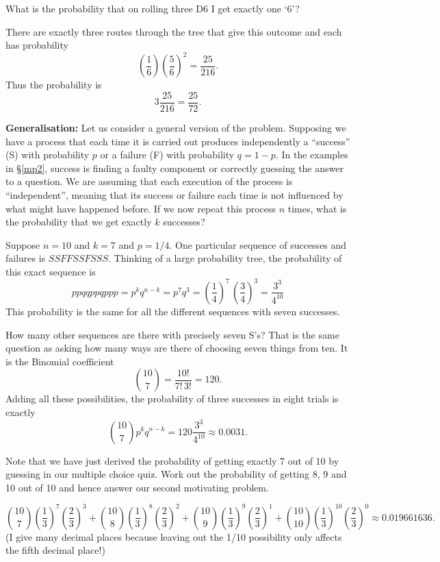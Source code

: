 \begin{example}
What is the probability that on rolling three D6 I get exactly one `6'? 

\noindent There are exactly three routes through the tree that give this outcome and each has probability 
 \[
      \left( \frac16 \right) \left( \frac56 \right)^2 = \frac{25}{216}.
 \]
Thus the probability is 
 \[
     3 \frac{25}{216} = \frac{25}{72}. 
 \] 
\end{example}
\noindent \textbf{Generalisation:} Let us consider a general version of the problem.  Supposing we have a process that each time it is carried out produces independently a ``success'' (S) with probability $p$ or a failure (F) with probability $q=1-p$. In the examples in \S\ref{mp2}, success is finding a faulty component or correctly guessing the answer to a question.  We are assuming that each execution of the process is ``independent'', meaning that its success or failure  each time is not influenced by what might have happened before.  If we now repeat this process $n$ times, what is the probability that we get exactly $k$ successes? 
\begin{example}
Suppose $n=10$ and $k=7$ and $p=1/4$. One particular sequence of successes and failures is $SSFFSSFSSS$. Thinking of a large probability tree, the probability of this exact sequence is 
 \[
    ppqqppqppp = p^k q^{n-k} = p^7 q^3 = \left( \frac14 \right)^7 \, \left( \frac34 \right)^3   = \frac{3^3}{4^{10}}
\]
This probability is the same for all the different sequences with seven successes. 

How many other sequences  are there with precisely seven S's?  That is the same question as asking how many ways are there of choosing seven things from ten.  It is the Binomial coefficient
 \[
       \binom{10}7 = \frac{10!}{7! \,3!} = 120. 
  \]
Adding all these possibilities, the probability of three successes in eight trials is exactly 
  \[
     \binom{10}7 p^k q^{n-k} = 120 \frac{3^3}{4^{10}} \approx 0.0031. 
  \]
\end{example}

\begin{exer}
Note that we have just derived the probability of getting exactly 7 out of 10 by guessing in our multiple choice quiz. Work out the probability of getting 8, 9 and 10 out of 10 and hence answer our second motivating problem. 
\end{exer}

\begin{sol}
\[
    \binom{10}{7} \left( \frac13\right)^7 \left( \frac23 \right)^3 +  
    \binom{10}{8} \left( \frac13\right)^8 \left( \frac23 \right)^2 +  
    \binom{10}{9} \left( \frac13\right)^9 \left( \frac23 \right)^1 +  
    \binom{10}{10} \left( \frac13\right)^{10} \left( \frac23 \right)^0  \approx 0.019661636.
 \]
 (I give many decimal places because leaving out the 1/10 possibility only affects the fifth decimal place!) 
\end{sol}

